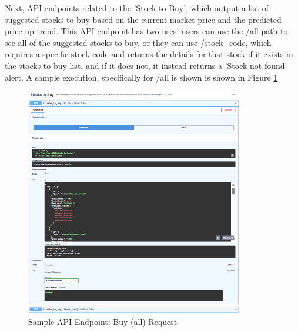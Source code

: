 Next, API endpoints related to the 'Stock to Buy', which output a list of 
suggested stocks to buy based on the current market price and the 
predicted price up-trend. This API endpoint has two uses: users can 
use the /all path to see all of the suggested stocks to buy, or 
they can use /stock\_code, which requires a specific stock code 
and returns the details for that stock if it exists in the stocks to buy list, 
and if it does not, it instead returns a 'Stock not found' alert.
A sample execution, specifically for
/all is shown is shown in Figure \ref{fig:alamAPI_buy}
\begin{figure}[ht]
    \centering
    \includegraphics[width=0.85\textwidth]{./assets/Chapter_4/Documentation/alamAPI_buy.png}
    \caption{Sample API Endpoint: Buy (all) Request}
    \label{fig:alamAPI_buy}
\end{figure}
\FloatBarrier

